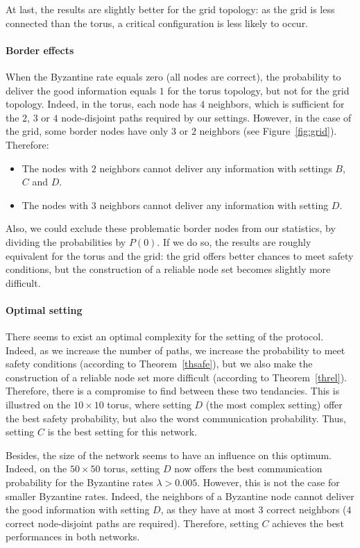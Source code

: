 \documentclass[a4paper,11pt]{article}
\begin{document}
At last, the results are slightly better for the grid topology: as the grid is less connected than the torus, a critical configuration is less likely to occur.

\paragraph{Border effects}

When the Byzantine rate equals zero (all nodes are correct), the probability to deliver the good information equals $1$ for the torus topology, but not for the grid topology. Indeed, in the torus, each node has $4$ neighbors, which is sufficient for the $2$, $3$ or $4$ node-disjoint paths required by our settings. However, in the case of the grid, some border nodes have only $3$ or $2$ neighbors (see Figure~\ref{fig:grid}). Therefore:
\begin{itemize}
\item The nodes with $2$ neighbors cannot deliver any information with settings $B$, $C$ and $D$.
\item The nodes with $3$ neighbors cannot deliver any information with setting $D$.
\end{itemize}
Also, we could exclude these problematic border nodes from our statistics, by dividing the probabilities by $P(0)$. If we do so, the results are roughly equivalent for the torus and the grid: the grid offers better chances to meet safety conditions, but the construction of a reliable node set becomes slightly more difficult.


\paragraph{Optimal setting}

There seems to exist an optimal complexity for the setting of the protocol.
Indeed, as we increase the number of paths, we increase the probability to meet safety conditions (according to Theorem~\ref{thsafe}), but we also make the construction of a reliable node set more difficult (according to Theorem~\ref{threl}). Therefore, there is a compromise to find between these two tendancies. This is illustred on the $10 \times 10$ torus, where setting $D$ (the most complex setting) offer the best safety probability, but also the worst communication probability.
Thus, setting $C$ is the best setting for this network.

Besides, the size of the network seems to have an influence on this optimum. Indeed, on the $50 \times 50$ torus, setting $D$ now offers the best communication probability for the Byzantine rates $\lambda > 0.005$.
However, this is not the case for smaller Byzantine rates. Indeed, the neighbors of a Byzantine node cannot deliver the good information with setting $D$, as they have at most $3$ correct neighbors ($4$ correct node-disjoint paths are required). Therefore, setting $C$ achieves the best performances in both networks.
\end{document}
